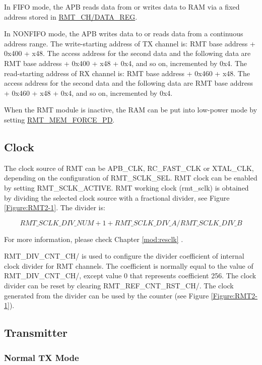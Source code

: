 \documentclass[main\_\_EN.tex]{subfiles}
\begin{document}
In FIFO mode, the APB reads data from or writes data to RAM via a fixed address stored in \hyperref[regdesc:RMTCHNDATAREG]{RMT\_CH/DATA\_REG}.

In NONFIFO mode, the APB writes data to or reads data from a continuous address range. The write-starting address of TX channel  is: RMT base address + 0x400 + x48. The access address for the second data and the following data are RMT base address + 0x400 + x48 + 0x4, and so on, incremented by 0x4. The read-starting address of RX channel  is: RMT base address + 0x460 + x48. The access address for the second data and the following data are RMT base address + 0x460 + x48 + 0x4, and so on, incremented by 0x4.

When the RMT module is inactive, the RAM can be put into low-power mode by setting  \hyperref[fielddesc:RMTMEMFORCEPD]{RMT\_MEM\_FORCE\_PD}.

\subsection{Clock}\label{clock}
The clock source of RMT can be APB\_CLK, RC\_FAST\_CLK or XTAL\_CLK, depending on the configuration of RMT\_SCLK\_SEL. RMT clock can be enabled by setting RMT\_SCLK\_ACTIVE. RMT working clock (rmt\_sclk) is obtained by dividing the selected clock source with a fractional divider, see Figure \ref{Figure:RMT2-1}. The divider is: 

$$
RMT\_SCLK\_DIV\_NUM + 1 + RMT\_SCLK\_DIV\_A/RMT\_SCLK\_DIV\_B
$$

For more information, please check Chapter \ref{mod:resclk} \textit{}.

RMT\_DIV\_CNT\_CH/ is used to configure the divider coefficient of internal clock divider for RMT channels. The coefficient is normally equal to the value of RMT\_DIV\_CNT\_CH/, except value 0 that represents coefficient 256. The clock divider can be reset by clearing RMT\_REF\_CNT\_RST\_CH/. The clock generated from the divider can be used by the counter (see Figure \ref{Figure:RMT2-1}).

\subsection{Transmitter}

\subsubsection{Normal TX Mode}
\end{document}
